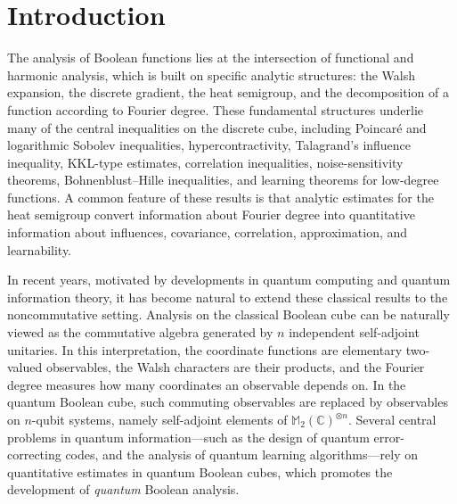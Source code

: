 \documentclass{amsbook}
\theoremstyle{definition}
\theoremstyle{remark}
\numberwithin{section}{chapter}
\numberwithin{equation}{chapter}
\newcommand{\1}{\mathbf{1}}
\begin{document}
\setcounter{page}{4}
\tableofcontents

\mainmatter
\chapter{Introduction}
The analysis of Boolean functions lies at the intersection of functional and harmonic analysis, which is built on specific analytic structures: the Walsh expansion, the discrete gradient, the heat semigroup, and the decomposition of a function according to Fourier degree. These fundamental structures underlie many of the central inequalities on the discrete cube, including Poincar\'e and logarithmic Sobolev inequalities, hypercontractivity, Talagrand's influence inequality, KKL-type estimates, correlation inequalities, noise-sensitivity theorems, Bohnenblust--Hille inequalities, and learning theorems for low-degree functions. A common feature of these results is that analytic estimates for the heat semigroup convert information about Fourier degree into quantitative information about influences, covariance, correlation, approximation, and learnability.

In recent years, motivated by developments in quantum computing and quantum information theory, it has become natural to extend these classical results to the noncommutative setting. Analysis on the classical Boolean cube can be naturally viewed as the commutative algebra generated by $n$ independent self-adjoint unitaries. In this interpretation, the coordinate functions are elementary two-valued observables, the Walsh characters are their products, and the Fourier degree measures how many coordinates an observable depends on. In the quantum Boolean cube, such
commuting observables are replaced by observables on $n$-qubit systems, namely self-adjoint elements of $\mathbb{M}_{2}(\mathbb{C})^{\otimes n}$. Several central problems in quantum information---such as the design of quantum error-correcting codes, and the analysis of quantum learning algorithms---rely on quantitative estimates in quantum Boolean cubes, which promotes the development of \emph{quantum} Boolean analysis.
\end{document}
